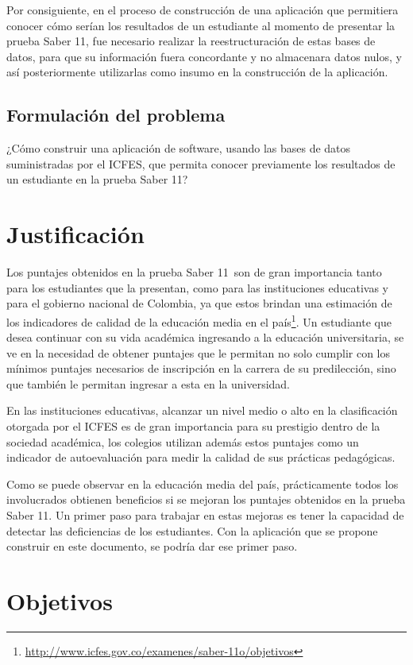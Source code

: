 Por consiguiente, en el proceso de construcción de una aplicación que permitiera conocer cómo serían los resultados de un estudiante al momento de presentar la prueba Saber 11\degree, fue necesario realizar la reestructuración de estas bases de datos, para que su información fuera concordante y no almacenara datos nulos, y así posteriormente utilizarlas como insumo en la construcción de la aplicación.
\subsection{Formulación del problema}
¿Cómo construir una aplicación de software, usando las bases de datos suministradas por el ICFES, que permita conocer previamente los resultados de un estudiante en la prueba Saber 11\degree?
\section{Justificación}
Los puntajes obtenidos en la prueba Saber 11\degree \ son de gran importancia tanto para los estudiantes que la presentan, como para las instituciones educativas y para el gobierno nacional de Colombia, ya que estos brindan una estimación de los indicadores de calidad de la educación media en el país\footnote{\url{http://www.icfes.gov.co/examenes/saber-11o/objetivos}}.
Un estudiante que desea continuar con su vida académica ingresando a la educación universitaria, se ve en la necesidad de obtener puntajes que le permitan no solo cumplir con los mínimos puntajes necesarios de inscripción en la carrera de su predilección, sino que también le permitan ingresar a esta en la universidad. 

En las instituciones educativas, alcanzar un nivel medio o alto en la clasificación otorgada por el ICFES es de gran importancia para su prestigio dentro de la sociedad académica, los colegios utilizan además estos puntajes como un indicador de autoevaluación para medir la calidad de sus prácticas pedagógicas. 

Como se puede observar en la educación media del país, prácticamente todos los involucrados obtienen beneficios si se mejoran los puntajes obtenidos en la prueba Saber 11\degree. Un primer paso para trabajar en estas mejoras es tener la capacidad de detectar las deficiencias de los estudiantes. Con la aplicación que se propone construir en este documento, se podría dar ese primer paso. 
\section{Objetivos}
